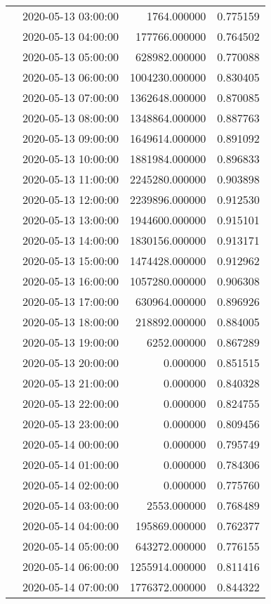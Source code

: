 \begin{tabular}{llrr}
 & 2020-05-13 03:00:00 & 1764.000000 & 0.775159 \\
 & 2020-05-13 04:00:00 & 177766.000000 & 0.764502 \\
 & 2020-05-13 05:00:00 & 628982.000000 & 0.770088 \\
 & 2020-05-13 06:00:00 & 1004230.000000 & 0.830405 \\
 & 2020-05-13 07:00:00 & 1362648.000000 & 0.870085 \\
 & 2020-05-13 08:00:00 & 1348864.000000 & 0.887763 \\
 & 2020-05-13 09:00:00 & 1649614.000000 & 0.891092 \\
 & 2020-05-13 10:00:00 & 1881984.000000 & 0.896833 \\
 & 2020-05-13 11:00:00 & 2245280.000000 & 0.903898 \\
 & 2020-05-13 12:00:00 & 2239896.000000 & 0.912530 \\
 & 2020-05-13 13:00:00 & 1944600.000000 & 0.915101 \\
 & 2020-05-13 14:00:00 & 1830156.000000 & 0.913171 \\
 & 2020-05-13 15:00:00 & 1474428.000000 & 0.912962 \\
 & 2020-05-13 16:00:00 & 1057280.000000 & 0.906308 \\
 & 2020-05-13 17:00:00 & 630964.000000 & 0.896926 \\
 & 2020-05-13 18:00:00 & 218892.000000 & 0.884005 \\
 & 2020-05-13 19:00:00 & 6252.000000 & 0.867289 \\
 & 2020-05-13 20:00:00 & 0.000000 & 0.851515 \\
 & 2020-05-13 21:00:00 & 0.000000 & 0.840328 \\
 & 2020-05-13 22:00:00 & 0.000000 & 0.824755 \\
 & 2020-05-13 23:00:00 & 0.000000 & 0.809456 \\
 & 2020-05-14 00:00:00 & 0.000000 & 0.795749 \\
 & 2020-05-14 01:00:00 & 0.000000 & 0.784306 \\
 & 2020-05-14 02:00:00 & 0.000000 & 0.775760 \\
 & 2020-05-14 03:00:00 & 2553.000000 & 0.768489 \\
 & 2020-05-14 04:00:00 & 195869.000000 & 0.762377 \\
 & 2020-05-14 05:00:00 & 643272.000000 & 0.776155 \\
 & 2020-05-14 06:00:00 & 1255914.000000 & 0.811416 \\
 & 2020-05-14 07:00:00 & 1776372.000000 & 0.844322 \\

\end{tabular}
